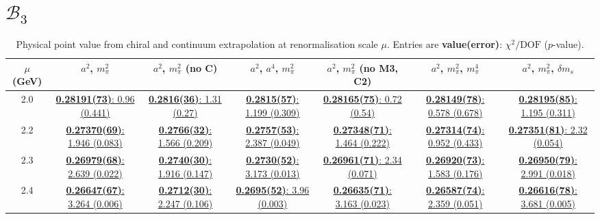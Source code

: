 \documentclass[12pt]{extarticle}
\begin{document}
\section{$\mathcal{B}_3$}
\begin{table}[h!]
\begin{center}
\begin{tabular}{|c|c|c|c|c|c|c|}
\hline
$\mu$ (GeV) & $a^2$, $m_\pi^2$& $a^2$, $m_\pi^2$ (no C)& $a^2$, $a^4$, $m_\pi^2$& $a^2$, $m_\pi^2$ (no M3, C2)& $a^2$, $m_\pi^2$, $m_\pi^4$& $a^2$, $m_\pi^2$, $\delta m_s$\\
\hline
2.0& \hyperlink{SSmPP/SUSY/a2m2_20.pdf.1}{\textbf{0.28191(73)}: 0.96 (0.441)} & \hyperlink{SSmPP/SUSY/a2m2noC_20.pdf.1}{\textbf{0.2816(36)}: 1.31 (0.27)} & \hyperlink{SSmPP/SUSY/a2a4m2_20.pdf.1}{\textbf{0.2815(57)}: 1.199 (0.309)} & \hyperlink{SSmPP/SUSY/a2m2mcut_20.pdf.1}{\textbf{0.28165(75)}: 0.72 (0.54)} & \hyperlink{SSmPP/SUSY/a2m2m4_20.pdf.1}{\textbf{0.28149(78)}: 0.578 (0.678)} & \hyperlink{SSmPP/SUSY/a2m2delm_20.pdf.1}{\textbf{0.28195(85)}: 1.195 (0.311)}\\
2.2& \hyperlink{SSmPP/SUSY/a2m2_22.pdf.1}{\textbf{0.27370(69)}: 1.946 (0.083)} & \hyperlink{SSmPP/SUSY/a2m2noC_22.pdf.1}{\textbf{0.2766(32)}: 1.566 (0.209)} & \hyperlink{SSmPP/SUSY/a2a4m2_22.pdf.1}{\textbf{0.2757(53)}: 2.387 (0.049)} & \hyperlink{SSmPP/SUSY/a2m2mcut_22.pdf.1}{\textbf{0.27348(71)}: 1.464 (0.222)} & \hyperlink{SSmPP/SUSY/a2m2m4_22.pdf.1}{\textbf{0.27314(74)}: 0.952 (0.433)} & \hyperlink{SSmPP/SUSY/a2m2delm_22.pdf.1}{\textbf{0.27351(81)}: 2.32 (0.054)}\\
2.3& \hyperlink{SSmPP/SUSY/a2m2_23.pdf.1}{\textbf{0.26979(68)}: 2.639 (0.022)} & \hyperlink{SSmPP/SUSY/a2m2noC_23.pdf.1}{\textbf{0.2740(30)}: 1.916 (0.147)} & \hyperlink{SSmPP/SUSY/a2a4m2_23.pdf.1}{\textbf{0.2730(52)}: 3.173 (0.013)} & \hyperlink{SSmPP/SUSY/a2m2mcut_23.pdf.1}{\textbf{0.26961(71)}: 2.34 (0.071)} & \hyperlink{SSmPP/SUSY/a2m2m4_23.pdf.1}{\textbf{0.26920(73)}: 1.583 (0.176)} & \hyperlink{SSmPP/SUSY/a2m2delm_23.pdf.1}{\textbf{0.26950(79)}: 2.991 (0.018)}\\
2.4& \hyperlink{SSmPP/SUSY/a2m2_24.pdf.1}{\textbf{0.26647(67)}: 3.264 (0.006)} & \hyperlink{SSmPP/SUSY/a2m2noC_24.pdf.1}{\textbf{0.2712(30)}: 2.247 (0.106)} & \hyperlink{SSmPP/SUSY/a2a4m2_24.pdf.1}{\textbf{0.2695(52)}: 3.96 (0.003)} & \hyperlink{SSmPP/SUSY/a2m2mcut_24.pdf.1}{\textbf{0.26635(71)}: 3.163 (0.023)} & \hyperlink{SSmPP/SUSY/a2m2m4_24.pdf.1}{\textbf{0.26587(74)}: 2.359 (0.051)} & \hyperlink{SSmPP/SUSY/a2m2delm_24.pdf.1}{\textbf{0.26616(78)}: 3.681 (0.005)}\\
\hline
\end{tabular}
\caption{Physical point value from chiral and continuum extrapolation at renormalisation scale $\mu$. Entries are \textbf{value(error)}: $\chi^2/\text{DOF}$ ($p$-value).}
\end{center}
\end{table}
\end{document}
